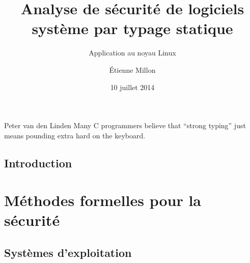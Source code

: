 \documentclass[a4paper,11pt]{memoir}
\title{Analyse de sécurité de logiciels système par typage statique}
\subtitle{Application au noyau Linux}
\author{Étienne Millon}
\date{10 juillet 2014}
\begin{document}
\frontmatter

\begin{titlingpage}
\titleUL{}
\end{titlingpage}

\begin{headingpage}
\hfill%
\begin{minipage}{0.6\textwidth}
\shorthandoff{;}
\begin{shadequote}[r]{Peter van den Linden}
Many C programmers believe that \enquote{strong typing}
just means pounding extra hard on the keyboard.
\end{shadequote}


\shorthandon{;}
\end{minipage}
\end{headingpage}%

\asuacknowledgements



\clearpage

\tableofcontents

\mainmatter

\chapter{Introduction}

\label{cha:intro}




\part{Méthodes formelles pour la sécurité}
\label{part:ctx}


\chapter{Systèmes d'exploitation}

\label{cha:os}


\end{document}

